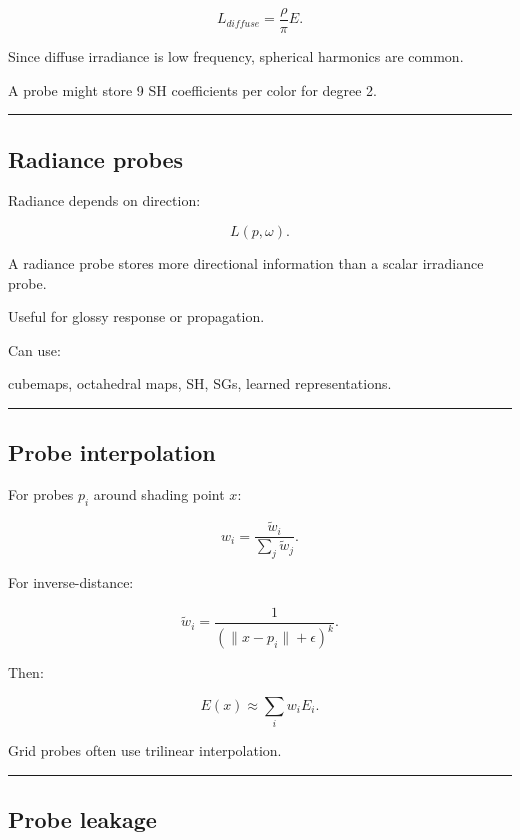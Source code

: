 \[
L_{diffuse}
=
\frac{\rho}{\pi}
E.
\]

Since diffuse irradiance is low frequency, spherical harmonics are common.

A probe might store 9 SH coefficients per color for degree 2.

\begin{center}\rule{0.5\linewidth}{0.5pt}\end{center}

\subsection{Radiance probes}\label{04-visual-computing-ii-ch040-radiance-probes}

Radiance depends on direction:

\[
L(p,\omega).
\]

A radiance probe stores more directional information than a scalar irradiance probe.

Useful for glossy response or propagation.

Can use:

cubemaps, octahedral maps, SH, SGs, learned representations.

\begin{center}\rule{0.5\linewidth}{0.5pt}\end{center}

\subsection{Probe interpolation}\label{04-visual-computing-ii-ch040-probe-interpolation}

For probes \(p_i\) around shading point \(x\):

\[
w_i=
\frac{
\tilde w_i
}{
\sum_j\tilde w_j
}.
\]

For inverse-distance:

\[
\tilde w_i=
\frac1{
(\|x-p_i\|+\epsilon)^k
}.
\]

Then:

\[
\boxed{
E(x)
\approx
\sum_iw_iE_i.
}
\]

Grid probes often use trilinear interpolation.

\begin{center}\rule{0.5\linewidth}{0.5pt}\end{center}

\subsection{Probe leakage}\label{04-visual-computing-ii-ch040-probe-leakage}

